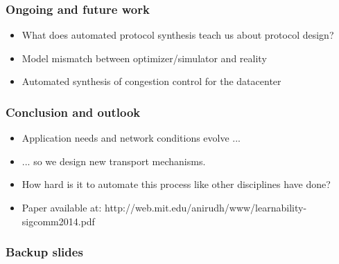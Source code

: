 \documentclass[svgnames]{beamer}
\begin{document}
\begin{Large}
\begin{frame}
\frametitle{Ongoing and future work}
\begin{itemize}
\item<1-> What does automated protocol synthesis teach us about protocol design?
\item<2-> Model mismatch between optimizer/simulator and reality
\item<3-> Automated synthesis of congestion control for the datacenter
\end{itemize}
\end{frame}

\begin{frame}
\frametitle{Conclusion and outlook}
\begin{itemize}
\item<1-> Application needs and network conditions evolve ...
\item<2-> ... so we design new transport mechanisms.
\item<3-> How hard is it to automate this process like other disciplines have done?
\item<4-> Paper available at: http://web.mit.edu/anirudh/www/learnability-sigcomm2014.pdf
\end{itemize}
\end{frame}

\end{Large}

\begin{frame}
\frametitle{Backup slides}
\end{frame}


\end{document}
